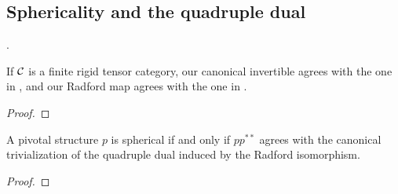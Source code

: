 \documentclass{amsart}
\begin{document}
\subsection{Sphericality and the quadruple dual}

.%



\begin{proposition}
If $\mathcal C$ is a finite rigid tensor category, our canonical invertible agrees with the one in \cite{MR2097289}, and our Radford map agrees with the one in \cite{MR2097289}.
\end{proposition}
\begin{proof}
\end{proof}

\begin{lemma} \label{lem:hspherical-implies-spherical}
A pivotal structure $p$ is spherical if and only if $p p^{**}$ agrees with the canonical trivialization of the quadruple dual induced by the Radford isomorphism.
\end{lemma}
\begin{proof}
\end{proof}






\end{document}
